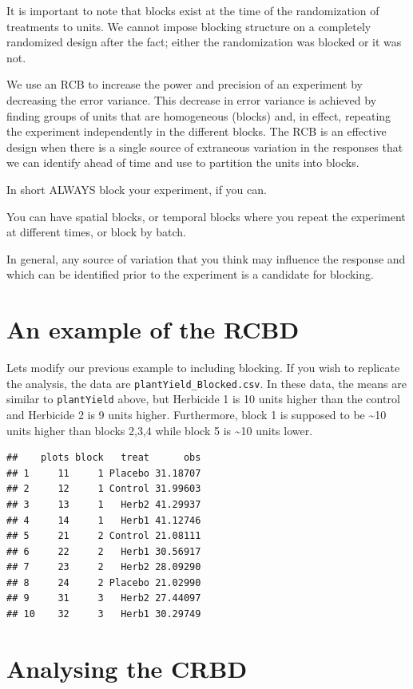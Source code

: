 \documentclass[
]{book}
\begin{document}
It is important to note that blocks exist at the time of the randomization of treatments to units. We cannot impose blocking structure on a completely randomized design after the fact; either the randomization was blocked or it was not.

We use an RCB to increase the power and precision of an experiment by decreasing the error variance. This decrease in error variance is achieved by finding groups of units that are homogeneous (blocks) and, in effect, repeating the experiment independently in the different blocks. The RCB is an effective design when there is a single source of extraneous variation in the responses that we can identify ahead of time and use to partition the units into blocks.

In short ALWAYS block your experiment, if you can.

You can have spatial blocks, or temporal blocks where you repeat the experiment at different times, or block by batch.

In general, any source of variation that you think may influence the response and which can be identified prior to the experiment is a candidate for blocking.

\section{An example of the RCBD}\label{an-example-of-the-rcbd}

Lets modify our previous example to including blocking. If you wish to replicate the analysis, the data are \texttt{plantYield\_Blocked.csv}. In these data, the means are similar to \texttt{plantYield} above, but Herbicide 1 is 10 units higher than the control and Herbicide 2 is 9 units higher. Furthermore, block 1 is supposed to be \textasciitilde10 units higher than blocks 2,3,4 while block 5 is \textasciitilde10 units lower.

\begin{verbatim}
##    plots block   treat      obs
## 1     11     1 Placebo 31.18707
## 2     12     1 Control 31.99603
## 3     13     1   Herb2 41.29937
## 4     14     1   Herb1 41.12746
## 5     21     2 Control 21.08111
## 6     22     2   Herb1 30.56917
## 7     23     2   Herb2 28.09290
## 8     24     2 Placebo 21.02990
## 9     31     3   Herb2 27.44097
## 10    32     3   Herb1 30.29749
\end{verbatim}

\section{Analysing the CRBD}\label{analysing-the-crbd}
\end{document}
